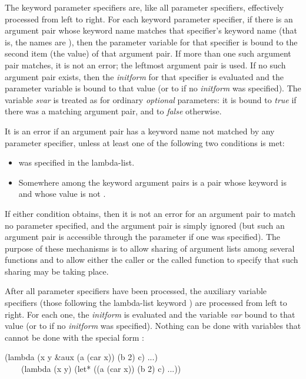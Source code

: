 The keyword parameter specifiers are, like all parameter specifiers,
effectively processed from left to right.
For each keyword parameter specifier, if there is an argument
pair whose keyword name matches that specifier's keyword name
(that is, the names are ),
then the parameter variable for that specifier is bound to the
second item (the value) of that argument pair.
If more than one such argument pair matches, it is not an error;
the leftmost argument pair is used.
If no such argument pair exists, then
the \emph{initform} for that specifier is evaluated
and the parameter variable is bound to that value (or to {\false} if
no \emph{initform} was specified).  The variable \emph{svar} is treated
as for ordinary \emph{optional} parameters: it is bound to \emph{true}
if there was a matching argument pair, and to \emph{false} otherwise.

It is an error if an argument pair has a keyword name not matched
by any parameter specifier, unless at least one of the following
two conditions is met:

\begin{itemize}
\item
{} was specified in the lambda-list.

\item
Somewhere among the keyword argument pairs is a pair whose keyword
is  and whose value is not {\false}.
\end{itemize}
If either condition obtains, then it is not an error
for an argument pair to match no parameter specified,
and the argument pair is simply ignored (but such an
argument pair is accessible through the  parameter if
one was specified). The purpose of these mechanisms is to
allow sharing of argument lists among several functions
and to allow either the caller or the called function
to specify that such sharing may be taking place.

After all parameter specifiers have been processed, the auxiliary
variable specifiers (those following the lambda-list keyword ) are processed from
left to right.  For each one, the \emph{initform} is evaluated and the
variable \emph{var} bound to that value (or to {\false} if no \emph{initform} was
specified).  Nothing can be done with  variables that cannot be
done with the special form :
\begin{lisp}
(lambda (x y \&aux (a (car x)) (b 2) c) ...) \\
~~~\EQ\ (lambda (x y) (let* ((a (car x)) (b 2) c) ...))
\end{lisp}

